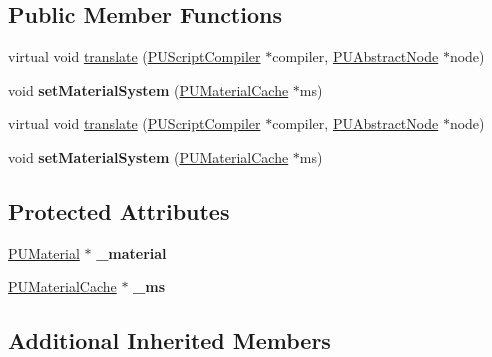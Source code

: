 \subsection*{Public Member Functions}
\begin{DoxyCompactItemize}
\item 
virtual void \hyperlink{classCCPUMaterialTranslator_ab532137abdb524d58e5187d6e7155d59}{translate} (\hyperlink{classPUScriptCompiler}{P\+U\+Script\+Compiler} $\ast$compiler, \hyperlink{classPUAbstractNode}{P\+U\+Abstract\+Node} $\ast$node)
\item 
\mbox{\label{classCCPUMaterialTranslator_a2652337e361e8a84970959694c47bd90}} 
void {\bfseries set\+Material\+System} (\hyperlink{classPUMaterialCache}{P\+U\+Material\+Cache} $\ast$ms)
\item 
virtual void \hyperlink{classCCPUMaterialTranslator_ac581cd1f8f91af246942215069369ed3}{translate} (\hyperlink{classPUScriptCompiler}{P\+U\+Script\+Compiler} $\ast$compiler, \hyperlink{classPUAbstractNode}{P\+U\+Abstract\+Node} $\ast$node)
\item 
\mbox{\label{classCCPUMaterialTranslator_a2652337e361e8a84970959694c47bd90}} 
void {\bfseries set\+Material\+System} (\hyperlink{classPUMaterialCache}{P\+U\+Material\+Cache} $\ast$ms)
\end{DoxyCompactItemize}
\subsection*{Protected Attributes}
\begin{DoxyCompactItemize}
\item 
\mbox{\label{classCCPUMaterialTranslator_adb441e7bb3351c074e1a108d23bf2ad8}} 
\hyperlink{classPUMaterial}{P\+U\+Material} $\ast$ {\bfseries \+\_\+material}
\item 
\mbox{\label{classCCPUMaterialTranslator_af3c7af6f0ba9cc3269a860a768245e18}} 
\hyperlink{classPUMaterialCache}{P\+U\+Material\+Cache} $\ast$ {\bfseries \+\_\+ms}
\end{DoxyCompactItemize}
\subsection*{Additional Inherited Members}



